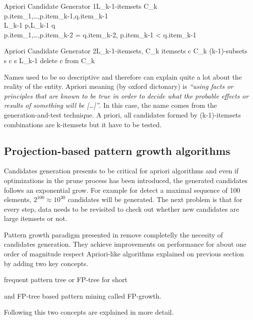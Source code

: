 \begin{pseudocode}{Apriori Candidate Generator 1}{L_{k-1}-itemsets}
\label{pc:apriori_candidate_generator1}
 \quad C_{k}\\
 \quad p.item_{1},\ldots,p.item_{k-1},q.item_{k-1}\\
 \quad L_{k-1} \quad p,L_{k-1} \quad q\\
 \quad p.item_{1},\ldots,p.item_{k-2} = q.item_{k-2}, 
p.item_{k-1} < q.item_{k-1}\\
\end{pseudocode}


\begin{pseudocode}{Apriori Candidate Generator 2}{L_{k-1}-itemsets, C_{k}}
\label{pc:apriori_candidate_generator2}
    \FORALL itemsets \quad c \in C_{k} \DO
    \BEGIN
        \FORALL (k-1)-subsets \quad s \in c \DO
        \BEGIN
            \IF s \not\in  L_{k-1} \THEN
                delete \quad c \quad from \quad C_{k}\\
        \END
    \END
\end{pseudocode}

Names used to be so descriptive and therefore can explain quite a lot about the
reality of the entity. Apriori meaning (by oxford dictonary) is {\it “using facts or
principles that are known to be true in order to decide what the probable
effects or results of something will be [\dots]”}. In this case, the name comes
from the generation-and-test technique. A priori, all candidates formed by
(k-1)-itemsets combinations are k-itemsets but it have to be tested.

\subsection{Projection-based pattern growth
algorithms}\label{ss:projection_based}

Candidates generation presents to be critical for apriori algorithms and even if
optimizations in the prune process has been introduced, the generated candidates
follows an exponential grow. For example for detect a maximal sequence of 100
elements, $2^{100} \approx 10^{30}$ candidates will be generated. The next
problem is that for every step, data needs to be revisited to check out whether 
new candidates are large itemsets or not. 

Pattern growth paradigm presented in \cite{han2000mining1} remove
completelly the necesity of candidates generation. They achieve improvements on
performance for about one order of magnitude respect Apriori-like algorithms
explained on previous section by adding two key concepts. 
\begin{enumerate*}[label=(\roman*)]
  \item frequent pattern tree or FP-tree for short
  \item and FP-tree based pattern mining called FP-growth.
\end{enumerate*}
Following this two concepts are explained in more detail.

